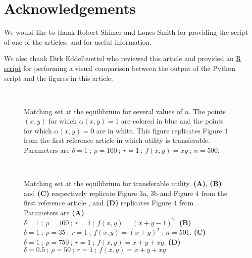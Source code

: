 \section*{Acknowledgements}
We would like to thank Robert Shimer and Lones Smith for providing the script of one of the articles, and for useful information.

We also thank Dirk Eddelbuettel who reviewed this article and provided an {\hypersetup{urlcolor=blue}\href{https://github.com/fgeoffroy/-Re-Assortative-matching-and-search/blob/main/README.md}{R script}} for performing a visual comparison between the output of the Python script and the figures in this article.

\def \smallScl {0.15}
\def \mediumScl {0.2}
\def \largeScl {0.3}



\begin{figure}[!ht]
	\centering
	\quad
	\quad
	\\
	\caption{Matching set at the equilibrium for several values of $n$. The points $(x,y)$ for which $\alpha(x,y)=1$ are colored in blue and the points for which $\alpha(x,y)=0$ are in white. This figure replicates Figure 1 from the first reference article \citep{shimer_assortative_2000} in which utility is transferable. Parameters are $\delta=1 \ ; \ \rho=100 \ ; \ r=1 \ ; \ f(x,y)=xy \ ; \ n=500$.}
	\label{fig:fig1}
\end{figure}

 

\begin{figure}[!ht]
	\centering
	\quad
	\\
	\quad
	\caption{Matching set at the equilibrium for transferable utility. \textbf{(A)}, \textbf{(B)} and \textbf{(C)} respectively replicate Figure 3a, 3b and Figure 4 from the first reference article \citep{shimer_assortative_2000}, and \textbf{(D)} replicates Figure 4 from \citep{smith_frictional_2011}. Parameters are \textbf{(A)} $\delta=1 \ ; \ \rho=100 \ ; \ r=1 \ ; \ f(x,y)=(x+y-1)^2$. \textbf{(B)} $\delta=1 \ ; \ \rho=35 \ ; \ r=1 \ ; \ f(x,y)=(x+y)^2 \ ; \ n=501$. \textbf{(C)} $\delta=1 \ ; \ \rho=750 \ ; \ r=1 \ ; \ f(x,y)=x+y+xy$. \textbf{(D)} $\delta=0.5 \ ; \ \rho=50 \ ; \ r=1 \ ; \ f(x,y)=x+y+xy$}
	\label{fig:fig2}
\end{figure}





